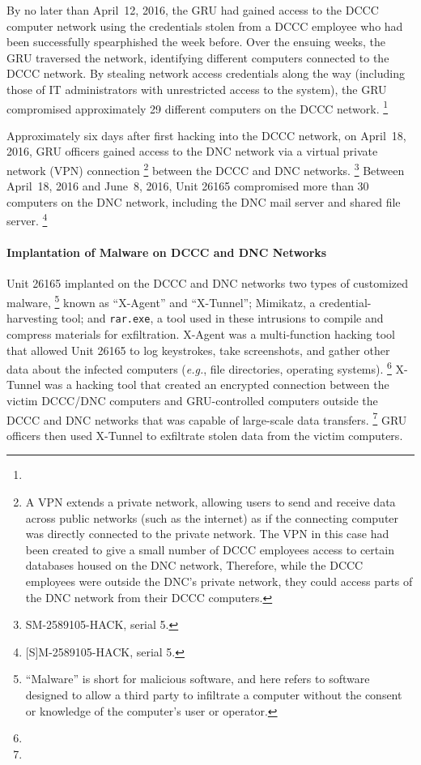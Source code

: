 By no later than April~12, 2016, the GRU had gained access to the DCCC computer network using the credentials stolen from a DCCC employee who had been successfully spearphished the week before.
Over the ensuing weeks, the GRU traversed the network, identifying different computers connected to the DCCC network.
By stealing network access credentials along the way (including those of IT administrators with unrestricted access to the system), the GRU compromised approximately 29 different computers on the DCCC network.%
\footnote{}

Approximately six days after first hacking into the DCCC network, on April~18, 2016, GRU officers gained access to the DNC network via a virtual private network (VPN) connection%
\footnote{A VPN extends a private network, allowing users to send and receive data across public networks (such as the internet) as if the connecting computer was directly connected to the private network.
The VPN in this case had been created to give a small number of DCCC employees access to certain databases housed on the DNC network, Therefore, while the DCCC employees were outside the DNC's private network, they could access parts of the DNC network from their DCCC computers.}
between the DCCC and DNC networks.%
\footnote{ SM-2589105-HACK, serial 5.}
Between April~18, 2016 and June~8, 2016, Unit 26165 compromised more than 30 computers on the DNC network, including the DNC mail server and shared file server.%
\footnote{ [S]M-2589105-HACK, serial 5.}

\paragraph{Implantation of Malware on DCCC and DNC Networks}

Unit 26165 implanted on the DCCC and DNC networks two types of customized malware,%
\footnote{``Malware'' is short for malicious software, and here refers to software designed to allow a third party to infiltrate a computer without the consent or knowledge of the computer's user or operator.}
known as ``X-Agent'' and ``X-Tunnel'';  Mimikatz, a credential-harvesting tool; and \verb+rar.exe+, a tool used in these intrusions to compile and compress materials for exfiltration.
X-Agent was a multi-function hacking tool that allowed Unit 26165 to log keystrokes, take screenshots, and gather other data about the infected computers (\textit{e.g.}, file directories,  operating systems).%
\footnote{}
X-Tunnel was a  hacking tool that created an encrypted connection between the victim DCCC/DNC computers and GRU-controlled computers outside the DCCC and DNC networks that was capable of large-scale data transfers.%
\footnote{}
GRU officers then used X-Tunnel to exfiltrate stolen data from the victim computers.

